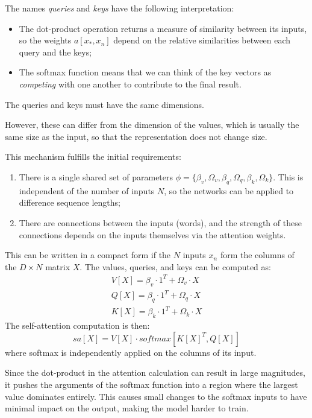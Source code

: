 The names \textit{queries} and \textit{keys} have the following interpretation:
\begin{itemize}
    \item The dot-product operation returns a measure of similarity between its
          inputs, so the weights $a[x_\ast, x_n]$ depend on the relative similarities
          between each query and the keys;
    \item The softmax function means that we can think of the key vectors as
          \textit{competing} with one another to contribute to the final result.
\end{itemize}
The queries and keys must have the same dimensions.

However, these can differ from the dimension of the values, which is usually the
same size as the input, so that the representation does not change size.

This mechanism fulfills the initial requirements:
\begin{enumerate}
    \item There is a single shared set of parameters $\phi = \{\beta_v, \Omega_v,
              \beta_q, \Omega_q, \beta_k, \Omega_k\}$. This is independent of the
          number of inputs $N$, so the networks can be applied to difference
          sequence lengths;
    \item There are connections between the inputs (words), and the strength of
          these connections depends on the inputs themselves via the attention weights.
\end{enumerate}

This can be written in a compact form if the $N$ inputs $x_n$ form the columns of
the $D \times N$ matrix $X$. The values, queries, and keys can be computed as:
\begin{align*}
    V[X] = \beta_v \cdot 1^T + \Omega_v \cdot X \\
    Q[X] = \beta_q \cdot 1^T + \Omega_q \cdot X \\
    K[X] = \beta_k \cdot 1^T + \Omega_k \cdot X
\end{align*}
The self-attention computation is then:
\begin{equation}
    sa[X] = V[X] \cdot softmax[K[X]^T, Q[X]]
\end{equation}
where softmax is independently applied on the columns of its input.

Since the dot-product in the attention calculation can result in large magnitudes,
it pushes the arguments of the softmax function into a region where the largest
value dominates entirely. This causes small changes to the softmax inputs to
have minimal impact on the output, making the model harder to train.

